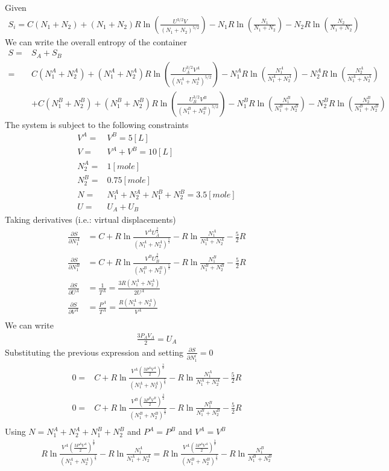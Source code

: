 \documentclass{article}
\numberwithin{equation}{section}
\begin{document}
Given
\begin{align*}
S_i=C(N_1+N_2)+(N_1+N_2)R\ln\left(\frac{U^{3/2}V}{(N_1+N_2)^{5/2}}\right)-N_1R\ln\left(\frac{N_1}{N_1+N_2}\right)-N_2R\ln\left(\frac{N_2}{N_1+N_2}\right)
\end{align*}
We can write the overall entropy of the container
\small
\begin{align*}
S=&S_A+S_B\\
 =&C(N_1^A+N_2^A)+(N_1^A+N_2^A)R\ln\left(\frac{U_A^{3/2}V^A}{(N_1^A+N_2^A)^{5/2}}\right)-N_1^AR\ln\left(\frac{N_1^A}{N_1^A+N_2^A}\right)-N_2^AR\ln\left(\frac{N_2^A}{N_1^A+N_2^A}\right)\\&+C(N_1^B+N_2^B)+(N_1^B+N_2^B)R\ln\left(\frac{U_B^{3/2}V^B}{(N_1^B+N_2^B)^{5/2}}\right)-N_1^BR\ln\left(\frac{N_1^B}{N_1^B+N_2^B}\right)-N_2^BR\ln\left(\frac{N_2^B}{N_1^B+N_2^B}\right)
\end{align*}
\normalsize
The system is subject to the following constraints
\begin{align*}
V^A=&V^B=5 [L]\\
V=&V^A+V^B=10 [L]\\
N_2^A=&1 [mole]\\
N_2^B=&0.75 [mole]\\
N=&N_1^A+N_2^A+N_1^B+N_2^B=3.5 [mole]\\
U=&U_A+U_B
\end{align*}
Taking derivatives (i.e.: virtual displacements)
\begin{align*}
\frac{\partial S}{\partial N_1^A}&=C+R\ln\frac{V^AU_A^{\frac{3}{2}}}{(N_1^A+N_2^A)^{\frac{5}{2}}}-R\ln\frac{N_1^A}{N_1^A+N_2^A}-\frac{5}{2}R\\
\frac{\partial S}{\partial N_1^B}&=C+R\ln\frac{V^BU_B^{\frac{3}{2}}}{(N_1^B+N_2^B)^{\frac{5}{2}}}-R\ln\frac{N_1^B}{N_1^B+N_2^B}-\frac{5}{2}R\\
\frac{\partial S}{\partial U^A}&=\frac{1}{T^A}=\frac{3R(N_1^A+N_2^A)}{2U^A}\\
\frac{\partial S}{\partial V^A}&=\frac{P^A}{T^A}=\frac{R(N_1^A+N_2^A)}{V^A}\\
\end{align*}
We can write
\begin{align*}
\frac{3P_AV_A}{2}=U_A
\end{align*}
Substituting the previous expression and setting $\frac{\partial S}{\partial N_1^i}=0$
\begin{align*}
0=&C+R\ln\frac{V^A(\frac{3P^AV^A}{2})^{\frac{3}{2}}}{(N_1^A+N_2^A)^{\frac{5}{2}}}-R\ln\frac{N_1^A}{N_1^A+N_2^A}-\frac{5}{2}R\\
0=&C+R\ln\frac{V^B(\frac{3P^BV^B}{2})^{\frac{3}{2}}}{(N_1^B+N_2^B)^{\frac{5}{2}}}-R\ln\frac{N_1^B}{N_1^B+N_2^B}-\frac{5}{2}R\\
\end{align*}
Using $N=N_1^A+N_2^A+N_1^B+N_2^B$ and $P^A=P^B$ and $V^A=V^B$ 
\begin{align*}
R\ln\frac{V^A(\frac{3P^AV^A}{2})^{\frac{3}{2}}}{(N_1^A+N_2^A)^{\frac{5}{2}}}-R\ln\frac{N_1^A}{N_1^A+N_2^A}=R\ln\frac{V^A(\frac{3P^AV^A}{2})^{\frac{3}{2}}}{(N_1^B+N_2^B)^{\frac{5}{2}}}-R\ln\frac{N_1^B}{N_1^B+N_2^B}\\
\end{align*}
\end{document}
